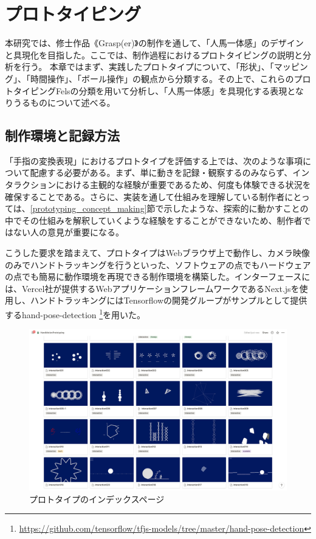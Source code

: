 \chapter{プロトタイピング}
\label{prototyping}
本研究では、修士作品《Grasp(er)》の制作を通して、「人馬一体感」のデザインと具現化を目指した。ここでは、制作過程におけるプロトタイピングの説明と分析を行う。
本章ではまず、実践したプロトタイプについて、「形状」、「マッピング」、「時間操作」、「ボール操作」の観点から分類する。その上で、これらのプロトタイピングFelsの分類を用いて分析し、「人馬一体感」を具現化する表現となりうるものについて述べる。

\section{制作環境と記録方法}
「手指の変換表現」におけるプロトタイプを評価する上では、次のような事項について配慮する必要がある。まず、単に動きを記録・観察するのみならず、インタラクションにおける主観的な経験が重要であるため、何度も体験できる状況を確保することである。さらに、実装を通して仕組みを理解している制作者にとっては、\ref{prototyping_concept_making}節で示したような、探索的に動かすことの中でその仕組みを解釈していくような経験をすることができないため、制作者ではない人の意見が重要になる。

こうした要求を踏まえて、プロトタイプはWebブラウザ上で動作し、カメラ映像のみでハンドトラッキングを行うといった、ソフトウェアの点でもハードウェアの点でも簡易に動作環境を再現できる制作環境を構築した。インターフェースには、Vercel社が提供するWebアプリケーションフレームワークであるNext.jsを使用し、ハンドトラッキングにはTensorflowの開発グループがサンプルとして提供するhand-pose-detection \footnote{\url{https://github.com/tensorflow/tfjs-models/tree/master/hand-pose-detection}}を用いた。

\begin{figure}[H]
  \centering
  \includegraphics[width=15cm]{img/prototype_overview.png}
  \caption{プロトタイプのインデックスページ}
  \label{fig:prototype_overview}
\end{figure}

